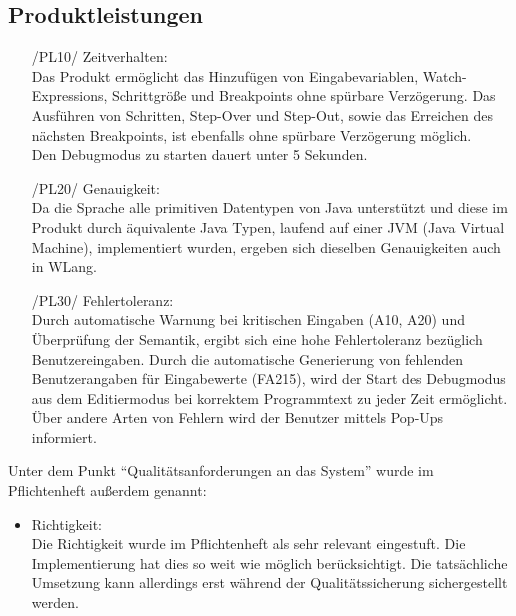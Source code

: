 \documentclass[parskip=full]{scrartcl}
\begin{document}
		\subsection{Produktleistungen}
		\begin{itemize}
		\item[/PL10/] Zeitverhalten: \\
		Das Produkt ermöglicht das Hinzufügen von Eingabevariablen, Watch-Expressions, Schrittgröße und Breakpoints ohne spürbare Verzögerung. Das Ausführen von Schritten, Step-Over und Step-Out, sowie das Erreichen des nächsten Breakpoints, ist ebenfalls ohne spürbare Verzögerung möglich. \\
		Den Debugmodus zu starten dauert unter 5 Sekunden. 
		\item[/PL20/] Genauigkeit: \\
		Da die Sprache alle primitiven Datentypen von Java unterstützt und diese im Produkt durch äquivalente Java Typen, laufend auf einer JVM (Java Virtual Machine), implementiert wurden, ergeben sich dieselben Genauigkeiten auch in WLang. 

		\item[/PL30/] Fehlertoleranz: \\
		Durch automatische Warnung bei kritischen Eingaben (A10, A20) und Überprüfung der Semantik, ergibt sich eine hohe Fehlertoleranz bezüglich Benutzereingaben.
		Durch die automatische Generierung von fehlenden Benutzerangaben für Eingabewerte (FA215), wird der Start des Debugmodus aus dem Editiermodus bei korrektem Programmtext zu jeder Zeit ermöglicht.
		Über andere Arten von Fehlern wird der Benutzer mittels Pop-Ups informiert.
		\end{itemize}
		
		Unter dem Punkt \enquote{Qualitätsanforderungen an das System} wurde im Pflichtenheft außerdem genannt:
		\begin{itemize}
		\item Richtigkeit: \\
		Die Richtigkeit wurde im Pflichtenheft als sehr relevant eingestuft. Die Implementierung hat dies so weit wie möglich berücksichtigt. Die tatsächliche Umsetzung kann allerdings erst während der Qualitätssicherung sichergestellt werden.
		\end{itemize}
		
\end{document}
